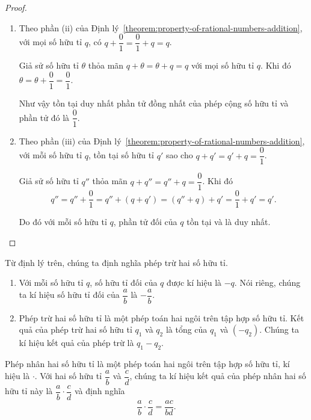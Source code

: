 \begin{proof}
    \begin{enumerate}[label={(\roman*)}]
        \item Theo phần (ii) của Định lý~\ref{theorem:property-of-rational-numbers-addition}, với mọi số hữu tỉ $q$, có $q + \dfrac{0}{1} = \dfrac{0}{1} + q = q$.

              Giả sử số hữu tỉ $\theta$ thỏa mãn $q + \theta = \theta + q = q$ với mọi số hữu tỉ $q$. Khi đó $\theta = \theta + \dfrac{0}{1} = \dfrac{0}{1}$.

              Như vậy tồn tại duy nhất phần tử đồng nhất của phép cộng số hữu tỉ và phần tử đó là $\dfrac{0}{1}$.
        \item Theo phần (iii) của Định lý~\ref{theorem:property-of-rational-numbers-addition}, với mỗi số hữu tỉ $q$, tồn tại số hữu tỉ $q'$ sao cho $q + q' = q' + q = \dfrac{0}{1}$.

              Giả sử số hữu tỉ $q''$ thỏa mãn $q + q'' = q'' + q = \dfrac{0}{1}$. Khi đó
              \[
                  q'' = q'' + \frac{0}{1} = q'' + (q + q') = (q'' + q) + q' = \frac{0}{1} + q' = q'.
              \]

              Do đó với mỗi số hữu tỉ $q$, phần tử đối của $q$ tồn tại và là duy nhất.
    \end{enumerate}
\end{proof}

Từ định lý trên, chúng ta định nghĩa phép trừ hai số hữu tỉ.
\begin{definition}
    \begin{enumerate}[label={(\roman*)}]
        \item Với mỗi số hữu tỉ $q$, số hữu tỉ đối của $q$ được kí hiệu là $-q$. Nói riêng, chúng ta kí hiệu số hữu tỉ đối của $\dfrac{a}{b}$ là $-\dfrac{a}{b}$.
        \item Phép trừ hai số hữu tỉ là một phép toán hai ngôi trên tập hợp số hữu tỉ. Kết quả của phép trừ hai số hữu tỉ $q_{1}$ và $q_{2}$ là tổng của $q_{1}$ và $(-q_{2})$. Chúng ta kí hiệu kết quả của phép trừ là $q_{1} - q_{2}$.
    \end{enumerate}
\end{definition}

\begin{definition}
    Phép nhân hai số hữu tỉ là một phép toán hai ngôi trên tập hợp số hữu tỉ, kí hiệu là $\cdot$. Với hai số hữu tỉ $\dfrac{a}{b}$ và $\dfrac{c}{d}$, chúng ta kí hiệu kết quả của phép nhân hai số hữu tỉ này là $\dfrac{a}{b}\cdot\dfrac{c}{d}$ và định nghĩa
    \[
        \frac{a}{b}\cdot\frac{c}{d} = \frac{ac}{bd}.
    \]
\end{definition}

